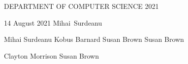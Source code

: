 \documentclass[dissertation,CC-BY-ND]{uathesis}
\begin{document}
\maketitlepage
{DEPARTMENT OF COMPUTER SCIENCE}	%
{2021}							

\approval
{14 August 2021}		%
{\mbox{Mihai Surdeanu}}		%

{Mihai Surdeanu}		%
{Kobus Barnard}		%
{Susan Brown} %
{Susan Brown} %

{Clayton Morrison}		%
{Susan Brown}		    %

\statementbyauthor


%
%
\tableofcontents
%
\listoffigures
%
\listoftables
%









\end{document}
